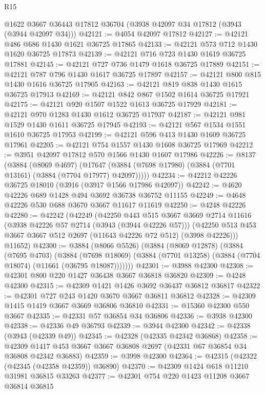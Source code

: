 \begin{lexlean}{R15}
\begin{coremodule}
    @1622
    @3667
    @36443
    @17812
    @36704
    (@3938 @42097 @34 @17812 (@3943 (@3944 @42097 @34)))
@42121 := @4054 @42097 @17812
@42127 := @42121 @486 @686 @1430 @1621 @36725 @17865
@42133 := @42121 @573 @712 @1430 @1620 @36725 @17873
@42139 := @42121 @716 @723 @1430 @1619 @36725 @17881
@42145 := @42121 @727 @736 @1479 @1618 @36725 @17889
@42151 := @42121 @787 @796 @1430 @1617 @36725 @17897
@42157 := @42121 @800 @815 @1430 @1616 @36725 @17905
@42163 := @42121 @819 @838 @1430 @1615 @36725 @17913
@42169 := @42121 @842 @867 @1502 @1614 @36725 @17921
@42175 := @42121 @920 @1507 @1522 @1613 @36725 @17929
@42181 := @42121 @970 @1283 @1430 @1612 @36725 @17937
@42187 := @42121 @981 @1529 @1430 @1611 @36725 @17945
@42193 := @42121 @567 @1534 @1551 @1610 @36725 @17953
@42199 := @42121 @596 @413 @1430 @1609 @36725 @17961
@42205 := @42121 @754 @1557 @1430 @1608 @36725 @17969
@42212 := @3951 @42097 @17812 @570 @1566 @1430 @1607 @17986
@42226 := @8137
    (@3884
      (@8069 @4697)
      (@17647 (@3884 (@7698 @17980) (@3884 (@7701 @13161) (@3884 (@7704 @17977) @42097)))))
@42234 := @42212 @42226 @36725 @18010 (@3916 (@3917 @1566 @17986 @42097))
@42242 := @4620 @42226 @689 @1428 @494 @3692 @36738 @36752 @11155
@42249 := @4648 @42226 @530 @688 @3670 @3667 @11617 @11619
@42250 := @4248 @42226
@42280 := @42242
    (@42249
      (@42250
        @443
        @515
        @3667
        @3669
        @2714
        @11616
        (@3938 @42226 @57 @2714 (@3943 (@3944 @42226 @57)))
        (@42250 @513 @453 @3667 @3667 @512 @2697 (@11643 @42226 @72 @512) (@3998 @42226)))
      @11652)
@42300 := @3884
    (@8066 @5526)
    (@3884
      (@8069 @12878)
      (@3884
        (@7695 @4703)
        (@3884
          (@7698 @18069)
          (@3884 (@7701 @13258) (@3884 (@7704 @18074) (@11661 (@36795 @18087)))))))
@42301 := @3988 @42300
@42308 := @42301 @800 @220 @1427 @36438 @3667 @36818 @36820
@42309 := @4248 @42300
@42315 := @42309 @1421 @1426 @3692 @36437 @36812 @36817
@42322 := @42301 @727 @243 @1420 @3670 @3667 @36811 @36812
@42328 := @42309 @1415 @1419 @3667 @3669 @36806 @36810
@42331 := @15360 @42300 @550 @3667
@42335 := @42331 @57 @36854 @34 @36806
@42336 := @3938 @42300
@42338 := @42336 @49 @36793
@42339 := @3944 @42300
@42342 := @42338 (@3943 (@42339 @49))
@42345 := @42328 (@42335 @42342 @36868)
@42358 := @42309 @1417 @453 @3667 @3667 @36808 @2697 (@42331 @67 @36854 @34 @36808 @42342 @36883)
@42359 := @3998 @42300
@42364 := @42315 (@42322 (@42345 (@42358 @42359)) @36890)
@42370 := @42309 @1424 @618 @11210 @31981 @36815 @33263
@42377 := @42301 @754 @220 @1423 @11208 @3667 @36814 @36815

\end{coremodule}
\end{lexlean}
